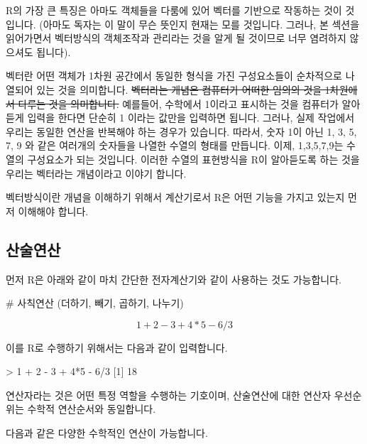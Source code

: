 \documentclass[tutorial.tex]{subfiles}
\begin{document}
R의 가장 큰 특징은 아마도 객체들을 다룸에 있어 벡터를 기반으로 작동하는 것이 것입니다.
(아마도 독자는 이 말이 무슨 뜻인지 현재는 모를 것입니다. 
그러나, 본 섹션을 읽어가면서 벡터방식의 객체조작과 관리라는 것을 알게 될 것이므로 너무 염려하지 않으셔도 됩니다).

벡터란 어떤 객체가 1차원 공간에서 동일한 형식을 가진 구성요소들이 순차적으로 나열되어 있는 것을 의미합니다.
\sout{벡터라는 개념은 컴퓨터가 어떠한 임의의 것을 1차원에서 다루는 것을 의미합니다.}
예를들어, 수학에서 1이라고 표시하는 것을 컴퓨터가 알아듣게 입력을 한다면 단순히 1 이라는 값만을 입력하면 됩니다. 
그러나, 실제 작업에서 우리는 동일한 연산을 반복해야 하는 경우가 있습니다. 
따라서, 숫자 1이 아닌 1, 3, 5, 7, 9 와 같은 여러개의 숫자들을 나열한 수열의 형태를 만듭니다. 
이제, 1,3,5,7,9는 수열의 구성요소가 되는 것입니다. 
이러한 수열의 표현방식을 R이 알아듣도록 하는 것을 우리는 벡터라는 개념이라고 이야기 합니다. 

벡터방식이란 개념을 이해하기 위해서 계산기로서 R은 어떤 기능을 가지고 있는지 먼저 이해해야 합니다.

\subsection{산술연산}

먼저 R은 아래와 같이 마치 간단한 전자계산기와 같이 사용하는 것도 가능합니다.

\begin{Schunk}
	\begin{Soutput}
# 사칙연산 (더하기, 빼기, 곱하기, 나누기)
	\end{Soutput}
\end{Schunk}

\begin{equation}
1 + 2 - 3 + 4*5 - 6/3
\end{equation}

이를 R로 수행하기 위해서는 다음과 같이 입력합니다. 

\begin{Schunk}
	\begin{Soutput}
> 1 + 2 - 3 + 4*5 - 6/3
[1] 18
	\end{Soutput}
\end{Schunk}

연산자라는 것은 어떤 특정 역할을 수행하는 기호이며, 산술연산에 대한  연산자 우선순위는 수학적 연산순서와 동일합니다. 

다음과 같은 다양한 수학적인 연산이 가능합니다. 
\end{document}
